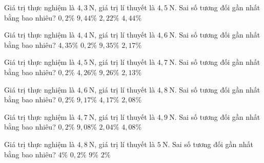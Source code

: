 \begin{ex}
Giá trị thực nghiệm là $4,3\ \mathrm{N}$, giá trị lí thuyết là $4,5\ \mathrm{N}$. Sai số tương đối gần nhất bằng bao nhiêu?
\choice
{$0,2\%$}
{$9,44\%$}
{$2,22\%$}
{\True $4,44\%$}
\end{ex}

\begin{ex}
Giá trị thực nghiệm là $4,4\ \mathrm{N}$, giá trị lí thuyết là $4,6\ \mathrm{N}$. Sai số tương đối gần nhất bằng bao nhiêu?
\choice
{\True $4,35\%$}
{$0,2\%$}
{$9,35\%$}
{$2,17\%$}
\end{ex}

\begin{ex}
Giá trị thực nghiệm là $4,5\ \mathrm{N}$, giá trị lí thuyết là $4,7\ \mathrm{N}$. Sai số tương đối gần nhất bằng bao nhiêu?
\choice
{$0,2\%$}
{\True $4,26\%$}
{$9,26\%$}
{$2,13\%$}
\end{ex}

\begin{ex}
Giá trị thực nghiệm là $4,6\ \mathrm{N}$, giá trị lí thuyết là $4,8\ \mathrm{N}$. Sai số tương đối gần nhất bằng bao nhiêu?
\choice
{$0,2\%$}
{$9,17\%$}
{\True $4,17\%$}
{$2,08\%$}
\end{ex}

\begin{ex}
Giá trị thực nghiệm là $4,7\ \mathrm{N}$, giá trị lí thuyết là $4,9\ \mathrm{N}$. Sai số tương đối gần nhất bằng bao nhiêu?
\choice
{$0,2\%$}
{$9,08\%$}
{$2,04\%$}
{\True $4,08\%$}
\end{ex}

\begin{ex}
Giá trị thực nghiệm là $4,8\ \mathrm{N}$, giá trị lí thuyết là $5\ \mathrm{N}$. Sai số tương đối gần nhất bằng bao nhiêu?
\choice
{\True $4\%$}
{$0,2\%$}
{$9\%$}
{$2\%$}
\end{ex}

